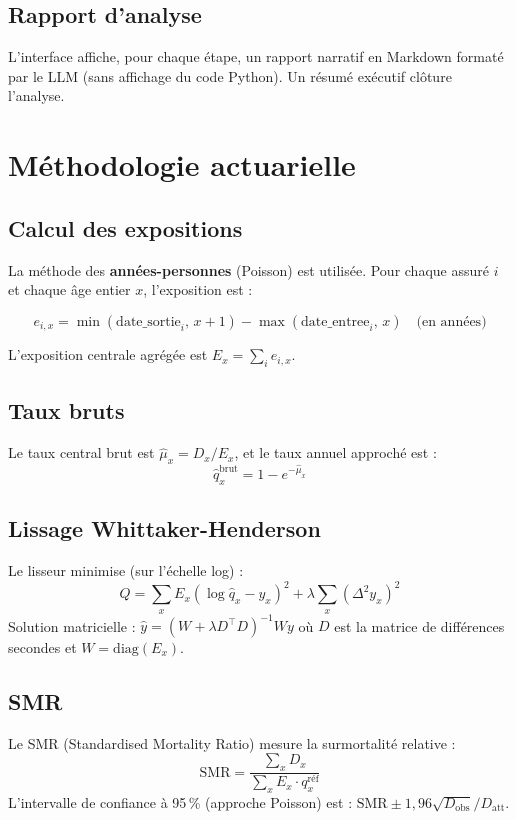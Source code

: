 \documentclass[11pt,a4paper]{article}
\begin{document}
\subsection{Rapport d'analyse}
L'interface affiche, pour chaque étape, un rapport narratif en Markdown formaté
par le LLM (sans affichage du code Python). Un résumé exécutif clôture l'analyse.

\section{Méthodologie actuarielle}

\subsection{Calcul des expositions}
La méthode des \textbf{années-personnes} (Poisson) est utilisée. Pour chaque assuré $i$
et chaque âge entier $x$, l'exposition est :

\[
  e_{i,x} = \min(\text{date\_sortie}_i,\, x+1) - \max(\text{date\_entree}_i,\, x) \quad \text{(en années)}
\]

L'exposition centrale agrégée est $E_x = \sum_i e_{i,x}$.

\subsection{Taux bruts}
Le taux central brut est $\hat{\mu}_x = D_x / E_x$, et le taux annuel approché est :
\[
  \hat{q}_x^{\text{brut}} = 1 - e^{-\hat{\mu}_x}
\]

\subsection{Lissage Whittaker-Henderson}
Le lisseur minimise (sur l'échelle log) :
\[
  Q = \sum_x E_x (\log \hat{q}_x - y_x)^2 + \lambda \sum_x (\Delta^2 y_x)^2
\]
Solution matricielle : $\hat{y} = (W + \lambda D^\top D)^{-1} W y$ où $D$ est la matrice
de différences secondes et $W = \text{diag}(E_x)$.

\subsection{SMR}
Le SMR (Standardised Mortality Ratio) mesure la surmortalité relative :
\[
  \text{SMR} = \frac{\sum_x D_x}{\sum_x E_x \cdot q_x^{\text{réf}}}
\]
L'intervalle de confiance à 95\,\% (approche Poisson) est :
$\text{SMR} \pm 1{,}96\sqrt{D_{\text{obs}}} / D_{\text{att}}$.
\end{document}
